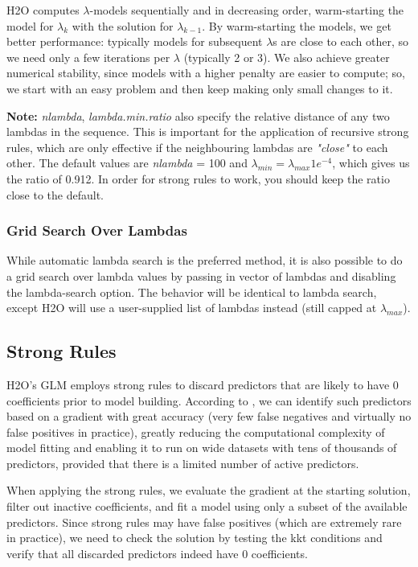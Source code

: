 \documentclass[11pt]{article}
\begin{document}
H2O computes $\lambda$-models sequentially and in decreasing order, warm-starting the model for $\lambda_k$ with the solution for $\lambda_{k-1}$. By warm-starting the models, we get better performance: typically models for subsequent $\lambda$s are close to each other, so we need only a few iterations per $\lambda$ (typically 2 or 3). We also achieve greater numerical stability, since models with a higher penalty are easier to compute; so, we start with an easy problem and then keep making only small changes to it.

\textbf{Note:} \textit{nlambda}, \textit{lambda.min.ratio} also specify the relative distance of any two lambdas in the sequence. This is important for the application of recursive strong rules, which are only effective if the neighbouring lambdas are \textit{"close"} to each other. The default values are \textit{nlambda} = 100 and $\lambda_{min} = \lambda_{max} 1e^{-4}$, which gives us the ratio of 0.912.   In order for strong rules to work, you should keep the ratio close to the default.  
    
\subsubsection{Grid Search Over Lambdas}
While automatic lambda search is the preferred method, it is also possible to do a grid search over lambda values by passing in vector of lambdas and disabling the lambda-search option. The behavior will be identical to lambda search, except H2O will use a user-supplied list of lambdas instead (still capped at $\lambda_{max}$).

\subsection{Strong Rules} %
H2O's GLM employs strong rules \cite{strong} to discard predictors that are likely to have 0 coefficients prior to model building. According to \cite{strong}, we can identify such predictors based on a gradient with great accuracy (very few false negatives and virtually no false positives in practice), greatly reducing the computational complexity of model fitting and enabling it to run on wide datasets with tens of thousands of predictors, provided that there is a limited number of active predictors. 

When applying the strong rules, we evaluate the gradient at the starting solution, filter out inactive coefficients, and fit a model using only a subset of the available predictors. Since strong rules may have false positives (which are extremely rare in practice), we need to check the solution by testing the kkt conditions and verify that all discarded predictors indeed have 0 coefficients.  
\end{document}

